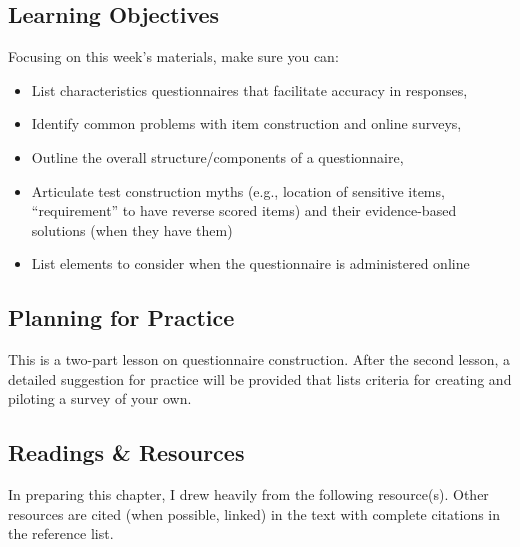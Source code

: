 \documentclass[
  english,
]{book}
\providecommand{\tightlist}{%
  \setlength{\itemsep}{0pt}\setlength{\parskip}{0pt}}
\begin{document}
\hypertarget{learning-objectives}{%
\subsection{Learning Objectives}\label{learning-objectives}}

Focusing on this week's materials, make sure you can:

\begin{itemize}
\tightlist
\item
  List characteristics questionnaires that facilitate accuracy in responses,
\item
  Identify common problems with item construction and online surveys,
\item
  Outline the overall structure/components of a questionnaire,
\item
  Articulate test construction myths (e.g., location of sensitive items, ``requirement'' to have reverse scored items) and their evidence-based solutions (when they have them)
\item
  List elements to consider when the questionnaire is administered online
\end{itemize}

\hypertarget{planning-for-practice}{%
\subsection{Planning for Practice}\label{planning-for-practice}}

This is a two-part lesson on questionnaire construction. After the second lesson, a detailed suggestion for practice will be provided that lists criteria for creating and piloting a survey of your own.

\hypertarget{readings-resources}{%
\subsection{Readings \& Resources}\label{readings-resources}}

In preparing this chapter, I drew heavily from the following resource(s). Other resources are cited (when possible, linked) in the text with complete citations in the reference list.
\end{document}
